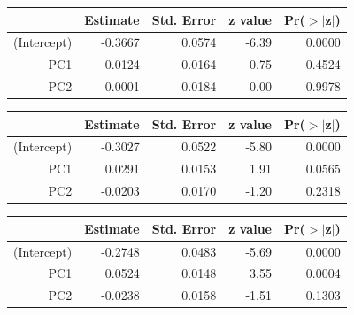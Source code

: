 \documentclass[a4paper,12pt]{Latex/Classes/PhDthesisPSnPDF}
\begin{document}
\begin{center}
\begin{table}[ht]
\centering
\begin{tabular}{rrrrr}
  \hline
 & Estimate & Std. Error & z value & Pr($>$$|$z$|$) \\ 
  \hline
(Intercept) & -0.3667 & 0.0574 & -6.39 & 0.0000 \\ 
  PC1 & 0.0124 & 0.0164 & 0.75 & 0.4524 \\ 
  PC2 & 0.0001 & 0.0184 & 0.00 & 0.9978 \\ 
   \hline
\end{tabular}
\end{table}\end{center}
\begin{center}
\begin{table}[ht]
\centering
\begin{tabular}{rrrrr}
  \hline
 & Estimate & Std. Error & z value & Pr($>$$|$z$|$) \\ 
  \hline
(Intercept) & -0.3027 & 0.0522 & -5.80 & 0.0000 \\ 
  PC1 & 0.0291 & 0.0153 & 1.91 & 0.0565 \\ 
  PC2 & -0.0203 & 0.0170 & -1.20 & 0.2318 \\ 
   \hline
\end{tabular}
\end{table}\end{center}

\newpage

\begin{center}
\begin{table}[ht]
\centering
\begin{tabular}{rrrrr}
  \hline
 & Estimate & Std. Error & z value & Pr($>$$|$z$|$) \\ 
  \hline
(Intercept) & -0.2748 & 0.0483 & -5.69 & 0.0000 \\ 
  PC1 & 0.0524 & 0.0148 & 3.55 & 0.0004 \\ 
  PC2 & -0.0238 & 0.0158 & -1.51 & 0.1303 \\ 
   \hline
\end{tabular}
\end{table}\end{center}
\end{document}
